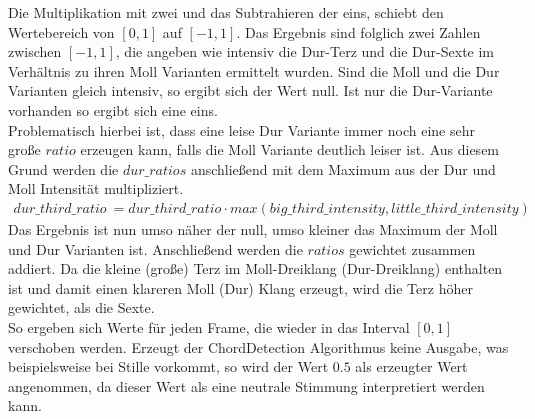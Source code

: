 \documentclass[11pt,a4paper]{article}
\begin{document}
\noindent
Die Multiplikation mit zwei und das Subtrahieren der eins, schiebt den Wertebereich von $[0, 1]$ auf $[-1, 1]$. Das Ergebnis sind folglich zwei Zahlen zwischen $[-1, 1]$, die angeben wie intensiv die Dur-Terz und die Dur-Sexte im Verhältnis zu ihren Moll Varianten ermittelt wurden. Sind die Moll und die Dur Varianten gleich intensiv, so ergibt sich der Wert null. Ist nur die Dur-Variante vorhanden so ergibt sich eine eins.\\
Problematisch hierbei ist, dass eine leise Dur Variante immer noch eine sehr große $ratio$ erzeugen kann, falls die Moll Variante deutlich leiser ist. Aus diesem Grund werden die $dur\_ratios$ anschließend mit dem Maximum aus der Dur und Moll Intensität multipliziert.
\begin{align}
dur\_third\_ratio\ = dur\_third\_ratio \cdot max(big\_third\_intensity, little\_third\_intensity)
\end{align}
\noindent
Das Ergebnis ist nun umso näher der null, umso kleiner das Maximum der Moll und Dur Varianten ist. Anschließend werden die $ratios$ gewichtet zusammen addiert. Da die kleine (große) Terz im Moll-Dreiklang (Dur-Dreiklang) enthalten ist und damit einen klareren Moll (Dur) Klang erzeugt, wird die Terz höher gewichtet, als die Sexte.\\
So ergeben sich Werte für jeden Frame, die wieder in das Interval $[0, 1]$ verschoben werden. Erzeugt der ChordDetection Algorithmus keine Ausgabe, was beispielsweise bei Stille vorkommt, so wird der Wert $0.5$ als erzeugter Wert angenommen, da dieser Wert als eine neutrale Stimmung interpretiert werden kann.
\end{document}
